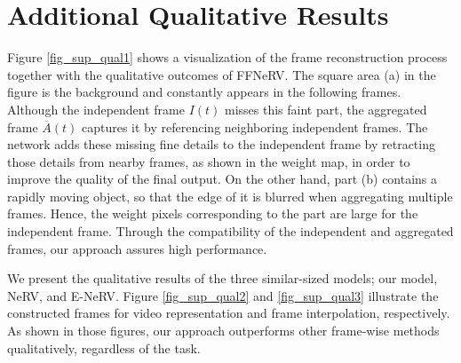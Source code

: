 \documentclass[sigconf]{acmart}
\begin{document}
\section{Additional Qualitative Results}
Figure \ref{fig_sup_qual1} shows a visualization of the frame reconstruction process together with the qualitative outcomes of FFNeRV.
The square area (a) in the figure is the background and constantly appears in the following frames.
Although the independent frame $I(t)$ misses this faint part, the aggregated frame $\overline{A}(t)$ captures it by referencing neighboring independent frames.
The network adds these missing fine details to the independent frame by retracting those details from nearby frames, as shown in the weight map, in order to improve the quality of the final output.
On the other hand, part (b) contains a rapidly moving object, so that the edge of it is blurred when aggregating multiple frames.
Hence, the weight pixels corresponding to the part are large for the independent frame.
Through the compatibility of the independent and aggregated frames, our approach assures high performance.

We present the qualitative results of the three similar-sized models; our model, NeRV, and E-NeRV.
Figure \ref{fig_sup_qual2} and \ref{fig_sup_qual3} illustrate the constructed frames for video representation and frame interpolation, respectively.
As shown in those figures, our approach outperforms other frame-wise methods qualitatively, regardless of the task.
\end{document}
